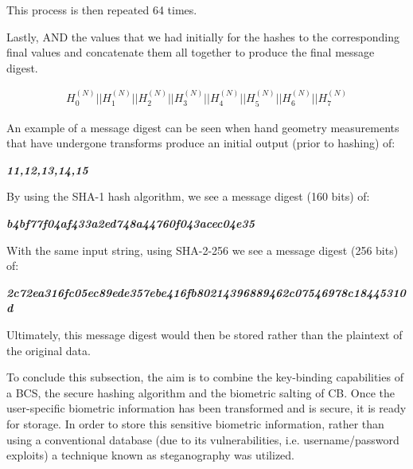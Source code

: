         This process is then repeated 64 times. 
        
        Lastly, AND the values that we had initially for the hashes to the corresponding final values and concatenate them all together to produce the final message digest.
        
        
        \begin{gather}
            H^{(N)}_0 || H^{(N)}_1 ||H^{(N)}_2 || H^{(N)}_3 || H^{(N)}_4 || H^{(N)}_5 || H^{(N)}_6 || H^{(N)}_7 
        \end{gather} 
        
        An example of a message digest can be seen when hand geometry measurements that have undergone transforms produce an initial output (prior to hashing) of: 

        \begin{center}
            \textbf{\textit{11,12,13,14,15}}
        \end{center}
        
        By using the SHA-1 hash algorithm, we see a message digest (160 bits) of:
        
        \begin{center}
            \textbf{\textit{b4bf77f04af433a2ed748a44760f043acec04e35}}
        \end{center}
        
        With the same input string, using SHA-2-256 we see a message digest (256 bits) of:
        
        \begin{center}
            \textbf{\textit{2c72ea316fc05ec89ede357ebe416fb80214396889462c07546978c18445310d}}
        \end{center}
        
    

Ultimately, this message digest would then be stored rather than the plaintext of the original data.

To conclude this subsection, the aim is to combine the key-binding capabilities of a BCS, the secure hashing algorithm and the biometric salting of CB. Once the user-specific biometric information has been transformed and is secure, it is ready for storage. In order to store this sensitive biometric information, rather than using a conventional database (due to its vulnerabilities, i.e. username/password exploits) a technique known as steganography was utilized. 


